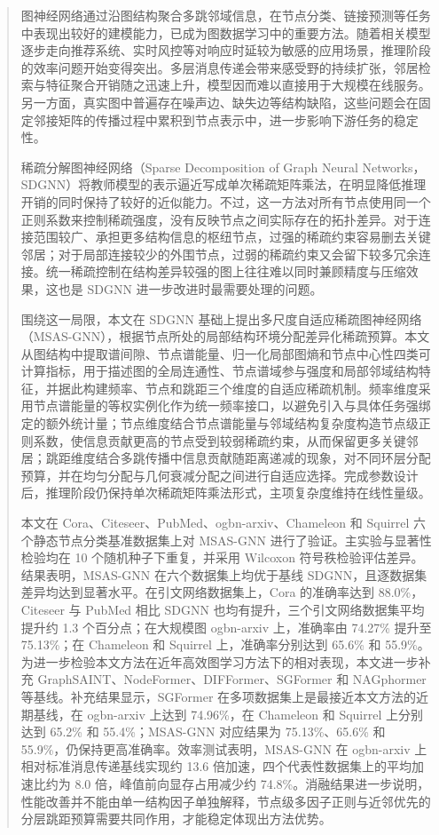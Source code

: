 

\begin{abstract}

图神经网络通过沿图结构聚合多跳邻域信息，在节点分类、链接预测等任务中表现出较好的建模能力，已成为图数据学习中的重要方法。随着相关模型逐步走向推荐系统、实时风控等对响应时延较为敏感的应用场景，推理阶段的效率问题开始变得突出。多层消息传递会带来感受野的持续扩张，邻居检索与特征聚合开销随之迅速上升，模型因而难以直接用于大规模在线服务。另一方面，真实图中普遍存在噪声边、缺失边等结构缺陷，这些问题会在固定邻接矩阵的传播过程中累积到节点表示中，进一步影响下游任务的稳定性。

稀疏分解图神经网络（Sparse Decomposition of Graph Neural Networks，SDGNN）将教师模型的表示逼近写成单次稀疏矩阵乘法，在明显降低推理开销的同时保持了较好的近似能力。不过，这一方法对所有节点使用同一个正则系数来控制稀疏强度，没有反映节点之间实际存在的拓扑差异。对于连接范围较广、承担更多结构信息的枢纽节点，过强的稀疏约束容易删去关键邻居；对于局部连接较少的外围节点，过弱的稀疏约束又会留下较多冗余连接。统一稀疏控制在结构差异较强的图上往往难以同时兼顾精度与压缩效果，这也是 SDGNN 进一步改进时最需要处理的问题。

围绕这一局限，本文在 SDGNN 基础上提出多尺度自适应稀疏图神经网络（MSAS-GNN），根据节点所处的局部结构环境分配差异化稀疏预算。本文从图结构中提取谱间隙、节点谱能量、归一化局部图熵和节点中心性四类可计算指标，用于描述图的全局连通性、节点谱域参与强度和局部邻域结构特征，并据此构建频率、节点和跳距三个维度的自适应稀疏机制。频率维度采用节点谱能量的等权实例化作为统一频率接口，以避免引入与具体任务强绑定的额外统计量；节点维度结合节点谱能量与邻域结构复杂度构造节点级正则系数，使信息贡献更高的节点受到较弱稀疏约束，从而保留更多关键邻居；跳距维度结合多跳传播中信息贡献随距离递减的现象，对不同环层分配预算，并在均匀分配与几何衰减分配之间进行自适应选择。完成参数设计后，推理阶段仍保持单次稀疏矩阵乘法形式，主项复杂度维持在线性量级。

本文在 Cora、Citeseer、PubMed、ogbn-arxiv、Chameleon 和 Squirrel 六个静态节点分类基准数据集上对 MSAS-GNN 进行了验证。主实验与显著性检验均在 10 个随机种子下重复，并采用 Wilcoxon 符号秩检验评估差异。结果表明，MSAS-GNN 在六个数据集上均优于基线 SDGNN，且逐数据集差异均达到显著水平。在引文网络数据集上，Cora 的准确率达到 88.0\%，Citeseer 与 PubMed 相比 SDGNN 也均有提升，三个引文网络数据集平均提升约 1.3 个百分点；在大规模图 ogbn-arxiv 上，准确率由 74.27\% 提升至 75.13\%；在 Chameleon 和 Squirrel 上，准确率分别达到 65.6\% 和 55.9\%。为进一步检验本文方法在近年高效图学习方法下的相对表现，本文进一步补充 GraphSAINT、NodeFormer、DIFFormer、SGFormer 和 NAGphormer 等基线。补充结果显示，SGFormer 在多项数据集上是最接近本文方法的近期基线，在 ogbn-arxiv 上达到 74.96\%，在 Chameleon 和 Squirrel 上分别达到 65.2\% 和 55.4\%；MSAS-GNN 对应结果为 75.13\%、65.6\% 和 55.9\%，仍保持更高准确率。效率测试表明，MSAS-GNN 在 ogbn-arxiv 上相对标准消息传递基线实现约 13.6 倍加速，四个代表性数据集上的平均加速比约为 8.0 倍，峰值前向显存占用减少约 74.8\%。消融结果进一步说明，性能改善并不能由单一结构因子单独解释，节点级多因子正则与近邻优先的分层跳距预算需要共同作用，才能稳定体现出方法优势。


\end{abstract}
